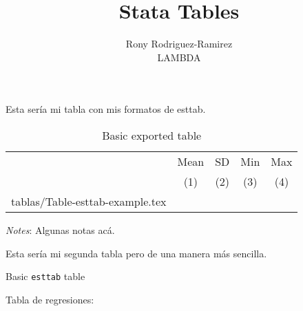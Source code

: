 \documentclass{article}
\makeatletter
\newcommand\primitiveinput[1]
{\@@input #1 }
\makeatother
\begin{document}
\title{Stata Tables}
\author{Rony Rodriguez-Ramirez \\ LAMBDA}
\maketitle
\listoftables
\newpage
Esta sería mi tabla con mis formatos de esttab.

\begin{table}[H]
	\centering
	\label{tab:Table}
	\begin{adjustbox}{max width=\linewidth}
		\begin{threeparttable}
			\caption{Basic exported table}
			\begin{tabular}{@{}l*{4}{c}@{}}
                \toprule
                \toprule 
        & Mean & SD & Min & Max \\
				& (1) & (2) & (3) & (4) \\
				\primitiveinput{tablas/Table-esttab-example.tex}
				\bottomrule
			\end{tabular}
			\begin{tablenotes}
				\setlength{}
				\footnotesize
				\item \textit{Notes}: Algunas notas acá.
			\end{tablenotes}
		\end{threeparttable}
	\end{adjustbox}
\end{table}

Esta sería mi segunda tabla pero de una manera más sencilla.

\begin{table}[H]
  \centering
	\caption{Basic \texttt{esttab} table}
	\begin{adjustbox}{max width = \textwidth}
		
	\end{adjustbox}
\end{table}

Tabla de regresiones:
\end{document}

